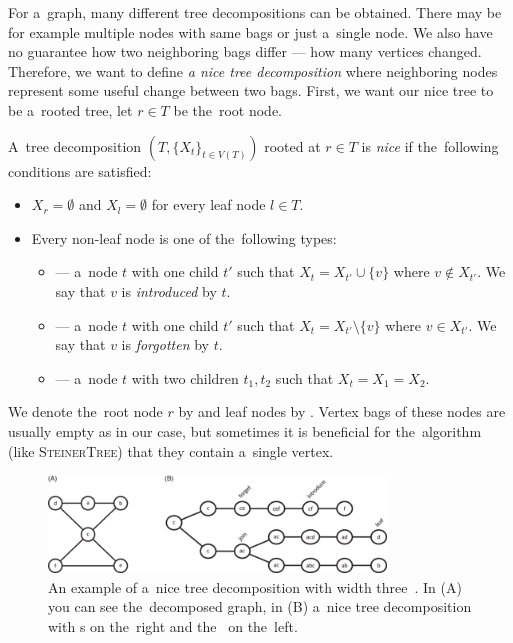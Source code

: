 For a~graph, many different tree decompositions can be obtained.
There may be for example multiple nodes with same bags or just a~single node.
We also have no guarantee how two neighboring bags differ --- how many vertices changed.
Therefore, we want to define \emph{a nice tree decomposition} where neighboring nodes
represent some useful change between two bags.
First, we want our nice tree to be a~rooted tree,
let \( r \in T \) be the~root node.
%
\begin{definition}
	A~tree decomposition \newline
	\( (T, {\{X_t\}}_{t \in V ( T )}) \) rooted at \( r \in T \)
	is \emph{nice} if the~following conditions are satisfied:
	\begin{itemize}
		\item \( X_r = \emptyset \) and \( X_l = \emptyset \) for every leaf node \( l \in T \).
		\item Every non-leaf node is one of the~following types:
		      \begin{itemize}
			      \item \IntroduceVertexNode{} --- a~node \( t \) with one child \( t' \)
			            such that \( X_t = X_{t'} \cup \{v\} \) where \( v \not\in X_{t'} \).
			            We say that \( v \) is \emph{introduced} by \( t \).
			      \item \ForgetVertexNode{} --- a~node \( t \) with one child \( t' \)
			            such that \( X_t = X_{t'} \setminus \{v\} \) where \( v \in X_{t'} \).
			            We say that \( v \) is \emph{forgotten} by \( t \).
			      \item \JoinNode{} --- a~node \( t \) with two children \( t_1, t_2 \)
			            such that \( X_t = X_1 = X_2 \).
		      \end{itemize}
	\end{itemize}
	We denote the~root node \( r \) by \RootNode{} and leaf nodes by \LeafNode{}.
	Vertex bags of these nodes are usually empty as in our case,
	but sometimes it is beneficial
	for the~algorithm (like \textsc{SteinerTree}) that they contain a~single vertex.
\end{definition}
%
\begin{figure}[ht]
	\begin{center}
		\includegraphics[width=0.80\textwidth]{./assets/nice_tree_decomposition.png}
	\end{center}
	\caption[Nice tree decomposition]{An example of a~nice tree decomposition with width three~\cite{nice_tree_decomposition_img}.
		In (A) you can see the~decomposed graph, in (B) a~nice tree decomposition
		with \LeafNode{}s on the~right and the~\RootNode{} on the~left.
	}%
	\label{fig:nice_tree_decomposition}
\end{figure}

